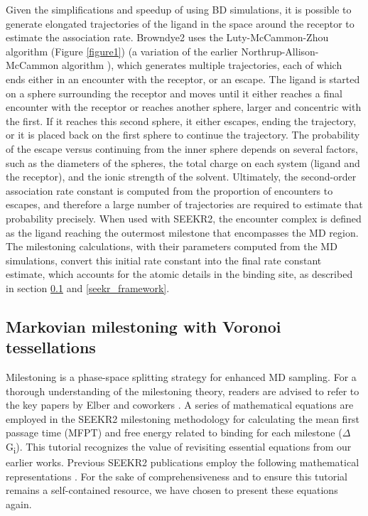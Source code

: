 \documentclass[9pt,training,pubversion]{livecoms}
\begin{document}
\noindent Given the simplifications and speedup of using BD simulations, it is possible to generate elongated trajectories of the ligand in the space around the receptor to estimate the association rate. Browndye2 uses the Luty-McCammon-Zhou algorithm (Figure \ref{figure1}) \cite{luty1992diffusive} (a variation of the earlier Northrup-Allison-McCammon algorithm \cite{northrup1984brownian}), which generates multiple trajectories, each of which ends either in an encounter with the receptor, or an escape. The ligand is started on a sphere surrounding the receptor and moves until it either reaches a final encounter with the receptor or reaches another sphere, larger and concentric with the first. If it reaches this second sphere, it either escapes, ending the trajectory, or it is placed back on the first sphere to continue the trajectory. The probability of the escape versus continuing from the inner sphere depends on several factors, such as the diameters of the spheres, the total charge on each system (ligand and the receptor), and the ionic strength of the solvent. Ultimately, the second-order association rate constant is computed from the proportion of encounters to escapes, and therefore a large number of trajectories are required to estimate that probability precisely. When used with SEEKR2, the encounter complex is defined as the ligand reaching the outermost milestone that encompasses the MD region. The milestoning calculations, with their parameters computed from the MD simulations, convert this initial rate constant into the final rate constant estimate, which accounts for the atomic details in the binding site, as described in section \ref{mmvt} and \ref{seekr_framework}. \par

\vspace{2mm}

\subsection{Markovian milestoning with Voronoi tessellations} \label{mmvt}
\vspace{2mm}

Milestoning is a phase-space splitting strategy for enhanced MD sampling. For a thorough understanding of the milestoning theory, readers are advised to refer to the key papers by Elber and coworkers \cite{vanden2008assumptions, bello2015exact, elber2020milestoning}. A series of mathematical equations are employed in the SEEKR2 milestoning methodology for calculating the mean first passage time (MFPT) and free energy related to binding for each milestone ($\Delta$G\textsubscript{i}). This tutorial recognizes the value of revisiting essential equations from our earlier works. Previous SEEKR2 publications employ the following mathematical representations \cite{jagger2020predicting, votapka2022seekr2, ojha2022selectivity, ojha2023qmrebind}. For the sake of comprehensiveness and to ensure this tutorial remains a self-contained resource, we have chosen to present these equations again. \par
\end{document}
